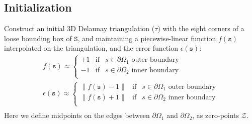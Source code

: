 \documentclass{article}
\theoremstyle{definition}
\theoremstyle{remark}
\begin{document}
\subsection{Initialization}
Construct an initial 3D Delaunay triangulation ($\tau$) with the eight corners of a loose bounding box of $\mathtt{S}$,  and maintaining a piecewise-linear function $f(\mathtt{s})$ interpolated on the triangulation, and the error function $\epsilon(\mathtt{s})$:
\begin{equation}
  \begin{array}{l}
f(\mathtt{s}) \approx \left\{
\begin{array}{lcl}
{+1} &\text{if} & s \in \partial \Omega_1 \text{ outer boundary} \\
{-1} &\text{if} & s \in \partial \Omega_2 \text{ inner boundary} \\  
\end{array}  
\right.\\
\epsilon(\mathtt{s}) \approx \left\{
\begin{array}{lcl}
{\parallel f(\mathtt{s})-1 \parallel} &\text{if} & s \in \partial \Omega_1 \text{ outer boundary} \\
{\parallel f(\mathtt{s})+1 \parallel} &\text{if} & s \in \partial \Omega_2 \text{ inner boundary} \\  
\end{array}  
\right.\\
\end{array}
\end{equation}
Here we define midpoints on the edges between $\partial \Omega_1$ and $\partial \Omega_2$, as zero-points $\mathcal{Z}$.
\end{document}
